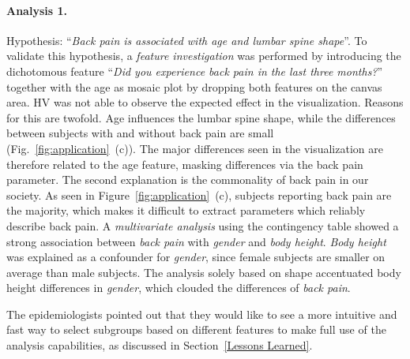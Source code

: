 \documentclass[journal]{style/vgtc} 			          %
\begin{document}
\paragraph{Analysis 1.}
Hypothesis: ``\emph{Back pain is associated with age and lumbar spine shape}''.
%
To validate this hypothesis, a \emph{feature investigation} was performed by introducing the dichotomous feature ``\emph{Did you experience back pain in the last three months?}'' together with the age as mosaic plot by dropping both features on the canvas area.
%
HV was not able to observe the expected effect in the visualization.
%
Reasons for this are twofold.
%
Age influences the lumbar spine shape, while the differences between subjects with and without back pain are small (Fig.~\ref{fig:application}~(c)).
%
The major differences seen in the visualization are therefore related to the age feature, masking differences via the back pain parameter.
%
The second explanation is the commonality of back pain in our society.
%
As seen in Figure~\ref{fig:application}~(c), subjects reporting back pain are the majority, which makes it difficult to extract parameters which reliably describe back pain.
%
A \emph{multivariate analysis} using the contingency table showed a strong association between \emph{back pain} with \emph{gender} and \emph{body height}.
%
\emph{Body height} was explained as a confounder for \emph{gender}, since female subjects are smaller on average than male subjects.
%
The analysis solely based on shape accentuated body height differences in \emph{gender}, which clouded the differences of \emph{back pain}.
%

The epidemiologists pointed out that they would like to see a more intuitive and fast way to select subgroups based on different features to make full use of the analysis capabilities, as discussed in Section~\ref{Lessons Learned}.
\end{document}
